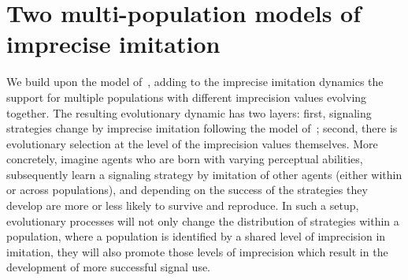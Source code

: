 \documentclass[a4paper]{article}
\begin{document}


\section{Two multi-population models of imprecise imitation}
\label{sec:multi-population-model}
We build upon the model of~\textcite{franke_vagueness_2017}, adding to the imprecise imitation dynamics the support for multiple populations with different imprecision values evolving together.
The resulting evolutionary dynamic has two layers: first, signaling strategies change by imprecise imitation following the model of~\textcite{franke_vagueness_2017}; second, there is evolutionary selection at the level of the imprecision values themselves.
More concretely, imagine agents who are born with varying perceptual abilities, subsequently learn a signaling strategy by imitation of other agents (either within or across populations), and depending on the success of the strategies they develop are more or less likely to survive and reproduce.
In such a setup, evolutionary processes will not only change the distribution of strategies within a population, where a population is identified by a shared level of imprecision in imitation, they will also promote those levels of imprecision which result in the development of more successful signal use.
\end{document}
